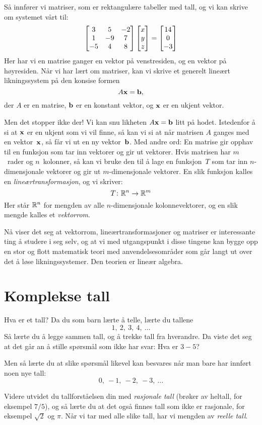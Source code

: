 Så innfører vi matriser, som er rektangulære tabeller med tall, og vi
kan skrive om systemet vårt til:
\[
\begin{bmatrix}
 3 &  5 & -2 \\
 1 & -9 &  7 \\
-5 &  4 &  8
\end{bmatrix}
\begin{bmatrix} x \\ y \\ z \end{bmatrix}
= \begin{bmatrix} 14 \\ 0 \\ -3 \end{bmatrix}
\]
Her har vi en matrise ganger en vektor på venstresiden, og en vektor
på høyresiden.  Når vi har lært om matriser, kan vi skrive et generelt
lineært likningssystem på den konsise formen
\[
A \mathbf{x} = \mathbf{b},
\]
der $A$ er en matrise, $\mathbf{b}$ er en konstant vektor, og $\mathbf{x}$ er en
ukjent vektor.

Men det stopper ikke der!  Vi kan snu likheten $A \mathbf{x} = \mathbf{b}$ litt
på hodet.  Istedenfor å si at $\mathbf{x}$ er en ukjent som vi vil finne,
så kan vi si at når matrisen $A$ ganges med en vektor~$\mathbf{x}$, så får
vi ut en ny vektor~$\mathbf{b}$.  Med andre ord: En matrise gir opphav til
en funksjon som tar inn vektorer og gir ut vektorer.  Hvis matrisen
har $m$~rader og $n$~kolonner, så kan vi bruke den til å lage en
funksjon~$T$ som tar inn $n$-dimensjonale vektorer og gir ut
$m$-dimensjonale vektorer.  En slik funksjon kalles en
\emph{lineærtransformasjon}, og vi skriver:
\[
T \colon \mathbb{R}^n \to \mathbb{R}^m
\]
Her står $\mathbb{R}^n$ for mengden av alle $n$-dimensjonale kolonnevektorer,
og en slik mengde kalles et \emph{vektorrom}.

Nå viser det seg at vektorrom, lineærtransformasjoner og matriser er
interessante ting å studere i seg selv, og at vi med utgangspunkt i
disse tingene kan bygge opp en stor og flott matematisk teori med
anvendelsesområder som går langt ut over det å løse likningssystemer.
Den teorien er lineær algebra.


\section*{Komplekse tall}

Hva er et tall?  Da du som barn lærte å telle, lærte du tallene
\[
1,\ 2,\ 3,\ 4,\ \ldots
\]
Så lærte du å legge sammen tall, og å trekke tall fra hverandre.  Da
viste det seg at det går an å stille spørsmål som ikke har svar: Hva
er $3 - 5$?

Men så lærte du at slike spørsmål likevel kan besvares når man bare
har innført noen nye tall:
\[
0,\ -1,\ -2,\ -3,\ \ldots
\]

Videre utvidet du tallforståelsen din med \emph{rasjonale tall}
(brøker av heltall, for eksempel $7/5$), og så lærte du at det også
finnes tall som ikke er rasjonale, for eksempel $\sqrt{2}$ og $\pi$.
Når vi tar med alle slike tall, har vi mengden av \emph{reelle tall}.

